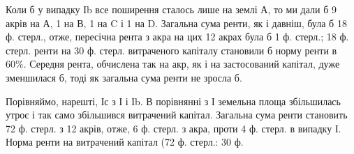 Коли б у випадку Іb все поширення сталось лише на землі А, то ми
дали б 9 акрів на А, 1 на В, 1 на C і 1 на D. Загальна сума ренти, як і давніш,
була б 18 ф. стерл., отже, пересічна рента з акра на цих 12 акрах
була б 1 ф. стерл.; 18 ф. стерл. ренти на 30 ф. стерл. витраченого капіталу
становили б норму ренти в 60\%. Середня рента, обчислена так на акр,
як і на застосований капітал, дуже зменшилася б, тоді як загальна сума ренти
не зросла б.

Порівняймо, нарешті, Іс з І і Іb. В порівнянні з І земельна площа збільшилась
утроє і так само збільшився витрачений капітал. Загальна сума ренти
становить 72 ф. стерл. з 12 акрів, отже, 6 ф. стерл. з акра, проти 4 ф.
стерл. в випадку І. Норма ренти на витрачений капітал (72 ф. стерл.: 30 ф.
\parbreak{}  %
